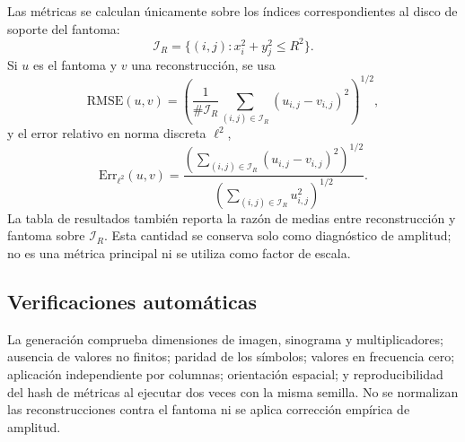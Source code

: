 Las métricas se calculan únicamente sobre los índices correspondientes al disco de soporte del fantoma:
\[
\mathcal I_R=\{(i,j):x_i^2+y_j^2\le R^2\}.
\]
Si $u$ es el fantoma y $v$ una reconstrucción, se usa
\[
\mathrm{RMSE}(u,v)
=
\left(
\frac{1}{\#\mathcal I_R}
\sum_{(i,j)\in\mathcal I_R}
(u_{i,j}-v_{i,j})^2
\right)^{1/2},
\]
y el error relativo en norma discreta $\ell^2$,
\[
\mathrm{Err}_{\ell^2}(u,v)
=
\frac{
\left(\sum_{(i,j)\in\mathcal I_R}(u_{i,j}-v_{i,j})^2\right)^{1/2}
}{
\left(\sum_{(i,j)\in\mathcal I_R}u_{i,j}^2\right)^{1/2}
}.
\]
La tabla de resultados también reporta la razón de medias entre reconstrucción y fantoma sobre $\mathcal I_R$. Esta cantidad se conserva solo como diagnóstico de amplitud; no es una métrica principal ni se utiliza como factor de escala.

\subsection*{Verificaciones automáticas}

La generación comprueba dimensiones de imagen, sinograma y multiplicadores; ausencia de valores no finitos; paridad de los símbolos; valores en frecuencia cero; aplicación independiente por columnas; orientación espacial; y reproducibilidad del hash de métricas al ejecutar dos veces con la misma semilla. No se normalizan las reconstrucciones contra el fantoma ni se aplica corrección empírica de amplitud.

